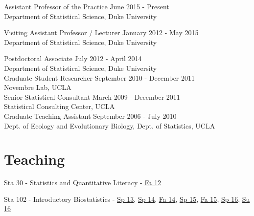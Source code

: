 \documentclass[margin,line]{res}
\begin{document}
\begin{resume}
Assistant Professor of the Practice \hfill June 2015 - Present \\
{Department of Statistical Science}, Duke University \\
\vspace{-0.25cm}

Visiting Assistant Professor / Lecturer  \hfill January 2012 - May 2015 \\
{Department of Statistical Science}, Duke University \\
\vspace{-0.25cm}

\vspace{-0.15cm}
Postdoctoral Associate  \hfill July 2012 - April 2014 \\
{Department of Statistical Science}, Duke University \\

\vspace{-0.15cm}
Graduate Student Researcher \hfill September 2010 - December 2011 \\
{Novembre Lab}, UCLA \\

\vspace{-0.15cm}
Senior Statistical Consultant \hfill March 2009 - December 2011 \\
{Statistical Consulting Center}, UCLA \\

\vspace{-0.15cm}
Graduate Teaching Assistant \hfill September 2006 - July 2010 \\
{Dept. of Ecology and Evolutionary Biology, Dept. of Statistics}, UCLA \\

\vspace{4mm}

\section{\sc Teaching}

Sta 30 - Statistics and Quantitative Literacy - \href{http://stat.duke.edu/courses/Spring12/sta10.1}{Fa 12}

Sta 102 - Introductory Biostatistics - \href{http://stat.duke.edu/courses/Spring13/sta102.001/}{Sp 13}, \href{https://stat.duke.edu/~cr173/Sta102_Sp14/}{Sp 14}, \href{https://stat.duke.edu/~cr173/Sta102_Fa14/}{Fa 14}, \href{https://stat.duke.edu/~cr173/Sta102_Sp15/}{Sp 15}, \href{https://stat.duke.edu/~cr173/Sta102_Fa15/}{Fa 15}, \href{http://stat.duke.edu/~cr173/Sta112_Sp16/}{Sp 16}, \href{http://stat.duke.edu/~cr173/Sta102_Su16/}{Su 16}


\end{resume}
\end{document}
